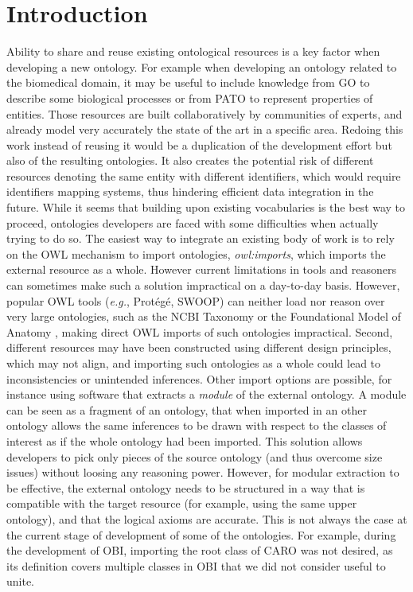 \documentclass{ao2e}%
\begin{document}
\section{Introduction}

Ability to share and reuse existing ontological resources is a key factor when developing a new ontology.
For example when developing an ontology related to the biomedical domain, it may be useful to include knowledge from \ac{GO}\cite{GO} to describe some biological processes or from \ac{PATO}\cite{PATO} to represent properties of entities.
Those resources are built collaboratively by communities of experts, and already model very accurately the state of the art in a specific area.
Redoing this work instead of reusing it would be a duplication of the development effort but also of the resulting ontologies. It also creates the potential risk of different resources denoting the same entity with different identifiers, which would require identifiers mapping systems, thus hindering efficient data integration in the future. 
While it seems that building upon existing vocabularies is the best way to proceed, ontologies developers are faced with some difficulties when actually trying to do so.
The easiest way to integrate an existing body of work is to rely on the \ac{OWL} \cite{OWL} mechanism to import ontologies, \emph{owl:imports}, which imports the external resource as a whole. However current limitations in tools and reasoners can sometimes make such a solution impractical on a day-to-day basis.
However, popular OWL tools (\emph{e.g.}, Prot\'eg\'e, SWOOP) can neither load nor reason %
over very large ontologies, such as the NCBI Taxonomy \cite{NCBI} or the Foundational Model of Anatomy \cite{FMA}, making direct \ac{OWL} imports of such ontologies impractical. 
Second, different resources may have been constructed using different design principles, which may not align, and importing such ontologies as a whole could lead to inconsistencies or unintended inferences.
Other import options are possible, for instance using software that extracts a \emph{module} \cite{Grau} of the external ontology.
A module can be seen as a fragment of an ontology, that when imported in an other ontology allows the same inferences to be drawn with respect to the classes of interest as if the whole ontology had been imported. This solution allows developers to pick only pieces of the source ontology (and thus overcome size issues) without loosing any reasoning power.
However, for modular extraction to be effective, the external ontology needs to be structured in a way that is compatible with the target resource (for example, using the same upper ontology), and that the logical axioms are accurate. 
This is not always the case at the current stage of development of some of the ontologies.
For example, during the development of  \ac{OBI}\cite{OBI}, importing the root class of \ac{CARO} was not desired, as its definition covers multiple classes in \ac{OBI} that we did not consider useful to unite. 
\end{document}

